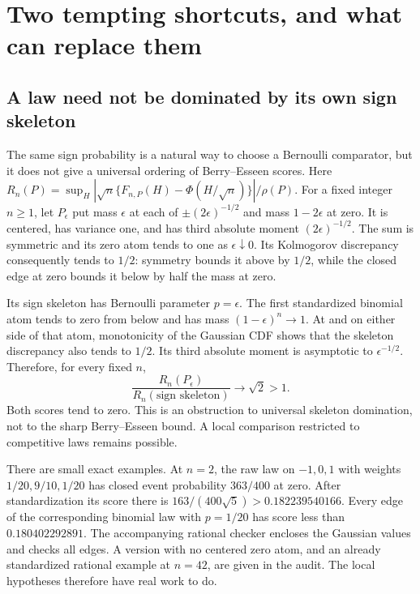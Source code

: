 \section{Two tempting shortcuts, and what can replace them}

\subsection{A law need not be dominated by its own sign skeleton}
The same sign probability is a natural way to choose a Bernoulli comparator,
but it does not give a universal ordering of Berry--Esseen scores.
Here $R_n(P)=\sup_H|\sqrt n\{F_{n,P}(H)-\Phi(H/\sqrt n)\}|/\rho(P)$.
For a fixed integer $n\ge1$, let $P_\epsilon$ put mass $\epsilon$ at
each of $\pm(2\epsilon)^{-1/2}$ and mass $1-2\epsilon$ at zero.
It is centered, has variance one, and has third absolute moment
$(2\epsilon)^{-1/2}$. The sum is symmetric and its zero atom tends to
one as $\epsilon\downarrow0$. Its Kolmogorov discrepancy consequently
tends to $1/2$: symmetry bounds it above by $1/2$, while the closed
edge at zero bounds it below by half the mass at zero.

Its sign skeleton has Bernoulli parameter $p=\epsilon$.
The first standardized binomial atom tends to zero from below and
has mass $(1-\epsilon)^n\to1$. At and on either side of that atom,
monotonicity of the Gaussian CDF shows that the skeleton discrepancy
also tends to $1/2$. Its third absolute moment is asymptotic to
$\epsilon^{-1/2}$. Therefore, for every fixed $n$,
\[
 \frac{R_n(P_\epsilon)}{R_n(\text{sign skeleton})}\longrightarrow\sqrt2>1.
\]
Both scores tend to zero. This is an obstruction to universal skeleton
domination, not to the sharp Berry--Esseen bound. A local comparison
restricted to competitive laws remains possible.

There are small exact examples. At $n=2$, the raw law on $-1,0,1$ with
weights $1/20,9/10,1/20$ has closed event probability $363/400$ at zero.
After standardization its score there is $163/(400\sqrt5)>0.182239540166$.
Every edge of the corresponding binomial law with $p=1/20$ has score
less than $0.180402292891$. The accompanying rational checker encloses
the Gaussian values and checks all edges. A version with no centered
zero atom, and an already standardized rational example at $n=42$, are
given in the audit. The local hypotheses therefore have real work to do.

